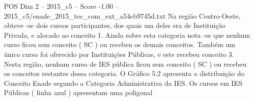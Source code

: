\begin{textsample}{POS Dim 2 – 2015\_c5 – Score -1.00 – 2015\_c5/enade\_2015\_tec\_com\_ext\_a54eb9745d.txt}
Na região Centro-Oeste, obteve -se dois cursos participantes, dos quais um deles era de Instituição Privada, e alocado ao conceito 1.
Ainda sobre esta categoria nota -se que nenhum curso ficou sem conceito ( SC ) ou recebeu os demais conceitos.
Também um único curso foi oferecido por Instituições Públicas, e este recebeu conceito 3.
Nesta região, nenhum curso de IES pública ficou sem conceito ( SC ) ou recebeu os conceitos restantes dessa categoria.
O Gráfico 5.2 apresenta a distribuição do Conceito Enade segundo a Categoria Administrativa da IES.
Os cursos em IES Públicas ( linha azul ) apresentam uma poligonal

\end{textsample}
